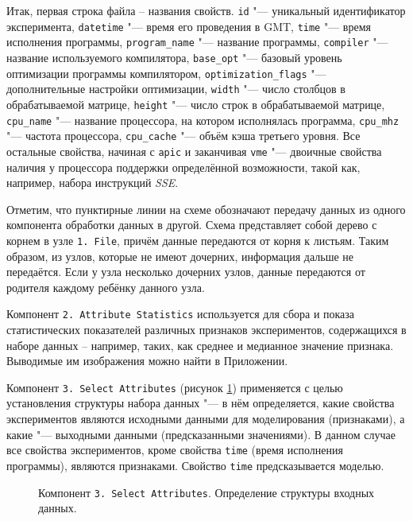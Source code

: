 Итак, первая строка файла -- названия свойств. \texttt{id} "--- уникальный идентификатор эксперимента, \texttt{datetime} "--- время его проведения в GMT, \texttt{time} "--- время исполнения программы, \texttt{program_name} "--- название программы, \texttt{compiler} "--- название используемого компилятора, \texttt{base_opt} "--- базовый уровень оптимизации программы компилятором, \texttt{optimization_flags} "--- дополнительные настройки оптимизации, \texttt{width} "--- число столбцов в обрабатываемой матрице, \texttt{height} "--- число строк в обрабатываемой матрице, \texttt{cpu_name} "--- название процессора, на котором исполнялась программа, \texttt{cpu_mhz} "--- частота процессора, \texttt{cpu_cache} "--- объём кэша третьего уровня. Все остальные свойства, начиная с \texttt{apic} и заканчивая \texttt{vme} "--- двоичные свойства наличия у процессора поддержки определённой возможности, такой как, например, набора инструкций \textit{SSE}.

Отметим, что пунктирные линии на схеме обозначают передачу данных из одного компонента обработки данных в другой. Схема представляет собой дерево с корнем в узле \texttt{1.\,File}, причём данные передаются от корня к листьям. Таким образом, из узлов, которые не имеют дочерних, информация дальше не передаётся. Если у узла несколько дочерних узлов, данные передаются от родителя каждому ребёнку данного узла.

Компонент \texttt{2.\,Attribute~Statistics} используется для сбора и показа статистических показателей различных признаков экспериментов, содержащихся в наборе данных -- например, таких, как среднее и медианное значение признака. Выводимые им изображения можно найти в Приложении.

Компонент \texttt{3.\,Select~Attributes} (рисунок \ref{img:3-Select-Attributes}) применяется с целью установления структуры набора данных "--- в нём определяется, какие свойства экспериментов являются исходными данными для моделирования (признаками), а какие "--- выходными данными (предсказанными значениями). В данном случае все свойства экспериментов, кроме свойства \texttt{time} (время исполнения программы), являются признаками. Свойство \texttt{time} предсказывается моделью.

\begin{figure}[H]
    \caption{Компонент \texttt{3.\,Select~Attributes}. Определение структуры входных данных.}
    \label{img:3-Select-Attributes}
\end{figure}

